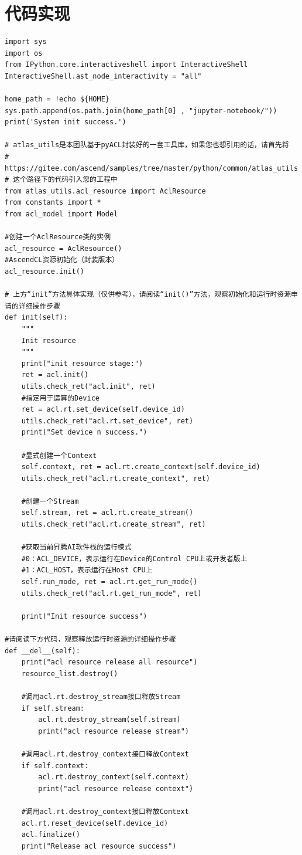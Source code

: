 \documentclass[12pt]{article}
\begin{document}
\section{代码实现}
\begin{verbatim}
import sys
import os
from IPython.core.interactiveshell import InteractiveShell
InteractiveShell.ast_node_interactivity = "all" 

home_path = !echo ${HOME}
sys.path.append(os.path.join(home_path[0] , "jupyter-notebook/"))
print('System init success.')

# atlas_utils是本团队基于pyACL封装好的一套工具库，如果您也想引用的话，请首先将
# https://gitee.com/ascend/samples/tree/master/python/common/atlas_utils
# 这个路径下的代码引入您的工程中
from atlas_utils.acl_resource import AclResource
from constants import *
from acl_model import Model

#创建一个AclResource类的实例
acl_resource = AclResource()
#AscendCL资源初始化（封装版本）
acl_resource.init()

# 上方“init”方法具体实现（仅供参考），请阅读“init()”方法，观察初始化和运行时资源申请的详细操作步骤
def init(self):
    """
    Init resource
    """
    print("init resource stage:")
    ret = acl.init()
    utils.check_ret("acl.init", ret)
    #指定用于运算的Device
    ret = acl.rt.set_device(self.device_id)
    utils.check_ret("acl.rt.set_device", ret)
    print("Set device n success.")

    #显式创建一个Context
    self.context, ret = acl.rt.create_context(self.device_id)
    utils.check_ret("acl.rt.create_context", ret)

    #创建一个Stream
    self.stream, ret = acl.rt.create_stream()
    utils.check_ret("acl.rt.create_stream", ret)

    #获取当前昇腾AI软件栈的运行模式
    #0：ACL_DEVICE，表示运行在Device的Control CPU上或开发者版上
    #1：ACL_HOST，表示运行在Host CPU上
    self.run_mode, ret = acl.rt.get_run_mode()
    utils.check_ret("acl.rt.get_run_mode", ret)

    print("Init resource success")

#请阅读下方代码，观察释放运行时资源的详细操作步骤
def __del__(self):
    print("acl resource release all resource")
    resource_list.destroy()
    
    #调用acl.rt.destroy_stream接口释放Stream
    if self.stream:
        acl.rt.destroy_stream(self.stream)
        print("acl resource release stream")
        
    #调用acl.rt.destroy_context接口释放Context
    if self.context:
        acl.rt.destroy_context(self.context)
        print("acl resource release context")
    
    #调用acl.rt.destroy_context接口释放Context
    acl.rt.reset_device(self.device_id)
    acl.finalize()
    print("Release acl resource success")
\end{verbatim}
\end{document}
